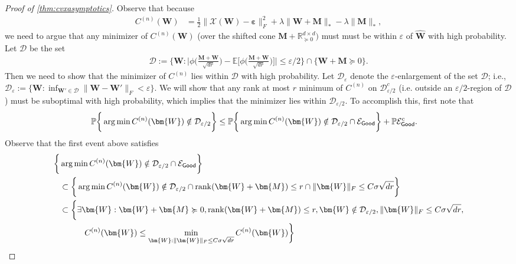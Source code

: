 \documentclass[10pt]{article}
\DeclareMathOperator*{\argmin}{arg\,min}
\newcommand{\eps}{\ensuremath{\varepsilon}}
\newcommand{\p}{\mathbb{P}}
\renewcommand{\hat}{\widehat}
\theoremstyle{definition}
\begin{document}
\begin{proof}[Proof of \cref{thm:cvxasymptotics}]
Observe that because
\begin{align}
    C^{(n)}(\bm{W}) &= \frac{1}{2} \| \mathcal{X}(\bm{W}) - \bm{\eps} \|_F^2 + \lambda \| \bm{W} + \bm{M} \|_* - \lambda \| \bm{M} \|_*,
\end{align}
we need to argue that any minimizer of $C^{(n)}(\bm{W})$ (over the shifted cone $\bm{M} + \mathbb{R}^{d\times d}_{\succcurlyeq 0})$ must must be within $\eps$ of $\bm{\hat W}$ with high probability.  Let $\mathcal{D}$ be the set \begin{align}
    \mathcal{D} := \big\{ \bm{W} : \bigg| \phi \big( \frac{\bm{M} + \bm{W}}{\sqrt{dr}}\big)- \mathbb{E} \big[ \phi \big(  \frac{\bm{M} + \bm{W}}{\sqrt{dr}}  \big) \big] \bigg| \leq \eps/2 \big\} \cap \{ \bm{W} + \bm{M} \succcurlyeq 0\}.
\end{align}
Then we need to show that the minimizer of $C^{(n)}$ lies within $\mathcal{D}$ with high probability.  Let $\mathcal{D}_{\eps}$ denote the $\eps$-enlargement of the set $\mathcal{D}$; i.e., $\mathcal{D}_{\eps} := \{ \bm{W} :\inf_{\bm{W}'\in \mathcal{D}} \|\bm{W} - \bm{W}'\|_F < \eps \}$.  We will show that any rank at most $r$ minimum of $C^{(n)}$ on $\mathcal{D}_{\eps/2}^c$ (i.e. outside an $\eps/2$-region of $\mathcal{D}$) must be suboptimal with high probability, which implies that the minimizer lies within $\mathcal{D}_{\eps/2}$.  To accomplish this, first note that 
\begin{align}
    \p\bigg\{ \argmin C^{(n)}(\bm{W}) \notin \mathcal{D}_{\eps/2} \bigg\} &\leq \p\bigg\{ \argmin C^{(n)}( \bm{W}) \notin \mathcal{D}_{\eps/2} \cap \mathcal{E}_{{\sf Good}} \bigg\} + \p  \mathcal{E}_{{\sf Good}}^c.
\end{align}
Observe that the first event above satisfies
\begin{align}
    \bigg\{ &\argmin C^{(n)}( \bm{W}) \notin \mathcal{D}_{\eps/2} \cap \mathcal{E}_{{\sf Good}} \bigg\}\\
    &\subset \bigg\{ \argmin C^{(n)}( \bm{W}) \notin \mathcal{D}_{\eps/2} \cap \mathrm{rank}(\bm{W} + \bm{M}) \leq r \cap \| \bm{W} \|_F \leq C \sigma \sqrt{dr} \bigg\} \\
    &\subset \bigg\{ \exists \bm{W} : \bm{W} + \bm{M} \succcurlyeq 0, \mathrm{rank}(\bm{W} + \bm{M}) \leq r, \bm{W} \notin \mathcal{D}_{\eps/2},\|\bm{W}\|_F \leq C \sigma \sqrt{dr}, \\
    &\quad \quad \quad C^{(n)} (\bm{W}) \leq \min_{\bm{W}:\|\bm{W}\|_F \leq C \sigma \sqrt{dr}} C^{(n)}(\bm{W}) \bigg\} \\

\end{align}
\end{proof}
\end{document}
